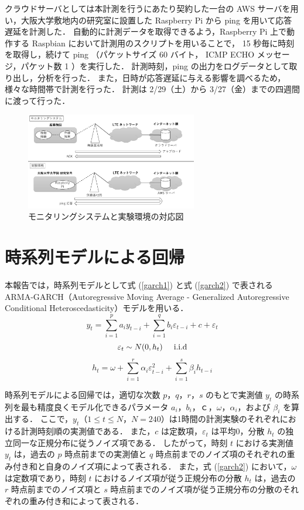 \documentclass[technicalreport]{ieicej}
\begin{document}
クラウドサーバとしては本計測を行うにあたり契約した一台の AWS サーバを用い，大阪大学敷地内の研究室に設置した Raspberry Pi から ping を用いて応答遅延を計測した．
自動的に計測データを取得できるよう，Raspberry Pi 上で動作する Raspbian において計測用のスクリプトを用いることで， 15 秒毎に時刻を取得し，続けて ping （パケットサイズ 60 バイト， ICMP ECHO メッセージ，パケット数 1 ）を実行した．
計測時刻，ping の出力をログデータとして取り出し，分析を行った．
また，日時が応答遅延に与える影響を調べるため，様々な時間帯で計測を行った．
計測は 2/29（土）から 3/27（金）までの四週間に渡って行った．

\begin{figure}[tb]
\centering
\includegraphics[width=7.5cm]{experiment.pdf}
\caption{モニタリングシステムと実験環境の対応図}
\label{exp}
\end{figure}

\section{時系列モデルによる回帰}
本報告では，時系列モデルとして式 (\ref{garch1}) と式 (\ref{garch2}) で表される ARMA-GARCH（Autoregressive Moving Average - Generalized Autoregressive Conditional Heteroscedasticity）モデル\cite{arma-garch}を用いる．
\begin{equation}
y_t = \sum_{i=1}^p a_i y_{t-i} + \sum_{i=1}^q b_i \varepsilon_{t-i} + c + \varepsilon_{t} 
\label{garch1}
\end{equation}
$$\varepsilon_t \sim N(0,h_t) \hspace{0.5cm} \rm{i.i.d}$$
\begin{equation}
\displaystyle h_{t} = \omega + \sum_{i=1}^{r}\alpha_i\varepsilon_{t-i}^2 + \sum_{i=1}^{s}\beta_ih_{t-i}
\label{garch2}
\end{equation}

時系列モデルによる回帰では，適切な次数 $p，q，r，s$ のもとで実測値 $y_t$ の時系列を最も精度良くモデル化できるパラメータ $a_i，b_i，ｃ，\omega，\alpha_i，$および $\beta_i$ を算出する．
ここで，$y_t（1\leq t\leq N，N=240）$は1時間の計測実験のそれぞれにおける計測時刻順の実測値である．
また，$c$ は定数項，$\varepsilon_t$ は平均0，分散 $h_t$ の独立同一な正規分布に従うノイズ項である．
したがって，時刻 $t$ における実測値 $y_t$ は，過去の $p$ 時点前までの実測値と $q$ 時点前までのノイズ項のそれぞれの重み付き和と自身のノイズ項によって表される．
また，式 (\ref{garch2}) において，$\omega$ は定数項であり，時刻 $t$ におけるノイズ項が従う正規分布の分散 $h_t$ は，過去の $r$ 時点前までのノイズ項と $s$ 時点前までのノイズ項が従う正規分布の分散のそれぞれの重み付き和によって表される．
\end{document}
